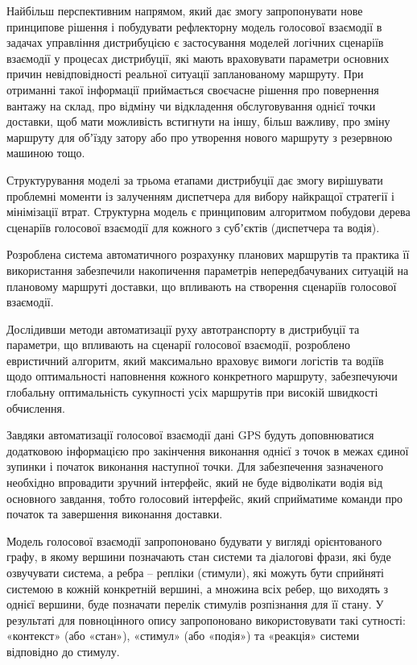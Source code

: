 Найбільш перспективним напрямом, який дає змогу запропонувати нове принципове рішення і побудувати рефлекторну модель голосової взаємодії в задачах управління дистрибуцією є застосування моделей логічних сценаріїв взаємодії у процесах дистрибуції, які мають враховувати параметри основних причин невідповідності реальної ситуації запланованому маршруту. При отриманні такої інформації приймається своєчасне рішення про повернення вантажу на склад, про відміну чи відкладення обслуговування однієї точки доставки, щоб мати можливість встигнути на іншу, більш важливу, про зміну маршруту для обʼїзду затору або про утворення нового маршруту з резервною машиною тощо.

Структурування моделі за трьома етапами дистрибуції дає змогу вирішувати проблемні моменти із залученням диспетчера для вибору найкращої стратегії і мінімізації втрат. Структурна модель є принциповим алгоритмом побудови дерева сценаріїв голосової взаємодії для кожного з субʼєктів (диспетчера та водія).

Розроблена система автоматичного розрахунку планових маршрутів та практика її використання забезпечили накопичення параметрів непередбачуваних ситуацій на плановому маршруті доставки, що впливають на створення сценаріїв голосової взаємодії.

Дослідивши методи автоматизації руху автотранспорту в дистрибуції та параметри, що впливають на сценарії голосової взаємодії, розроблено евристичний алгоритм, який максимально враховує вимоги логістів та водіїв щодо оптимальності наповнення кожного конкретного маршруту, забезпечуючи глобальну оптимальність сукупності усіх маршрутів при високій швидкості обчислення.

Завдяки автоматизації голосової взаємодії дані GPS будуть доповнюватися додатковою інформацією про закінчення виконання однієї з точок в межах єдиної зупинки і початок виконання наступної точки. Для забезпечення зазначеного необхідно впровадити зручний інтерфейс, який не буде відволікати водія від основного завдання, тобто голосовий інтерфейс, який сприйматиме команди про початок та завершення виконання доставки.

Модель голосової взаємодії запропоновано будувати у вигляді орієнтованого графу, в якому вершини позначають стан системи та діалогові фрази, які буде озвучувати система, а ребра – репліки (стимули), які можуть бути сприйняті системою в кожній конкретній вершині, а множина всіх ребер, що виходять з однієї вершини, буде позначати перелік стимулів розпізнання для її стану. У результаті для повноцінного опису запропоновано використовувати такі сутності: «контекст» (або «стан»), «стимул» (або «подія») та «реакція» системи відповідно до стимулу.

